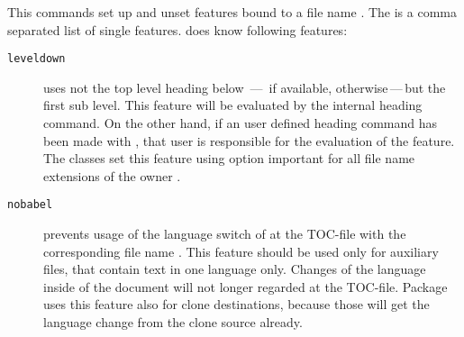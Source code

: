 \begin{Declaration}
\end{Declaration}
This commands set up and unset features bound to a file name
. The  is a comma separated list of
single features.  does know following features:
\begin{description}
\item[\texttt{leveldown}] uses not the top level heading below
  \,---\, if available, 
  otherwise\,---\,but the first sub level. This feature will be evaluated by
  the internal heading command. On the other hand, if an user defined heading
  command has been made with , that user is responsible
  for the evaluation of the feature. The \KOMAScript{} classes set this
  feature using option
  important{}%
   for all file name extensions of the
  owner .
\item[\texttt{nobabel}] prevents usage of the language switch of
   at the TOC-file with the corresponding
  file name . This feature should be used only for auxiliary
  files, that contain text in one language only. Changes of the language
  inside of the document will not longer regarded at the TOC-file. Package
   uses
  this feature also for clone destinations, because those will get the
  language change from the clone source already.


\end{description}
